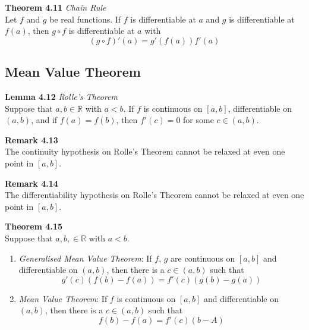 \documentclass[8pt,landscape]{article}
\begin{document}
\begin{multicols}{3}
    \textbf{Theorem 4.11} \emph{Chain Rule} \\
    Let $f$ and $g$ be real functions.
    If $f$ is differentiable at $a$ and $g$ is differentiable at $f(a)$, then
    $g \circ f$ is differentiable at $a$ with
    \[
        (g \circ f)'(a) = g'(f(a))f'(a)
    \]

    \subsection{Mean Value Theorem}

    \textbf{Lemma 4.12} \emph{Rolle's Theorem} \\
    Suppose that $a, b \in \mathbb{R}$ with $a < b$.
    If $f$ is continuous on $[a, b]$, differentiable on $(a, b)$, and if $f(a) = f(b)$,
    then $f'(c) = 0$ for some $c \in (a, b)$.

    \textbf{Remark 4.13} \\
    The continuity hypothesis on Rolle's Theorem cannot be relaxed at even one point
    in $[a, b]$.

    \textbf{Remark 4.14} \\
    The differentiability hypothesis on Rolle's Theorem cannot be relaxed at even one point
    in $[a, b]$.

    \textbf{Theorem 4.15} \\
    Suppose that $a, b, \in \mathbb{R}$ with $a<b$.
    \begin{enumerate}
        \item \emph{Generalised Mean Value Theorem}:
            If $f$, $g$ are continuous on $[a, b]$ and differentiable on $(a, b)$,
            then there is a $c \in (a, b)$ such that
            \[
                g'(c) (f(b) - f(a)) = f'(c) (g(b) - g(a))
            \]

        \item \emph{Mean Value Theorem}:
            If $f$ is continuous on $[a, b]$ and differentiable on $(a, b)$, then there
            is a $c \in (a, b)$ such that
            \[
                f(b) - f(a) = f'(c)(b-A)
            \]

    \end{enumerate}


\end{multicols}
\end{document}
